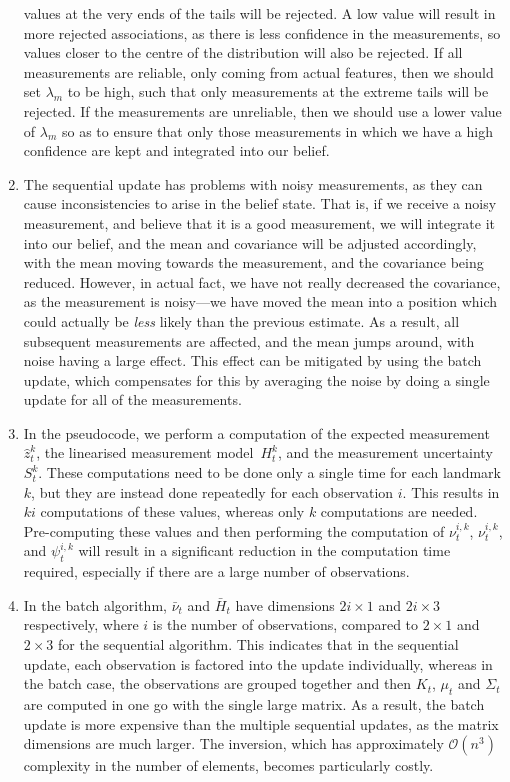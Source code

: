 \documentclass[a4paper,12pt]{article}
\begin{document}
\begin{enumerate}[resume]
  values at the very ends of the tails will be rejected. A low value will result
  in more rejected associations, as there is less confidence in the
  measurements, so values closer to the centre of the distribution will also be
  rejected. If all measurements are reliable, only coming from actual features,
  then we should set $\lambda_m$ to be high, such that only measurements at the
  extreme tails will be rejected. If the measurements are unreliable, then we
  should use a lower value of $\lambda_m$ so as to ensure that only those
  measurements in which we have a high confidence are kept and integrated into
  our belief.
\item The sequential update has problems with noisy measurements, as they can
  cause inconsistencies to arise in the belief state. That is, if we receive a
  noisy measurement, and believe that it is a good measurement, we will
  integrate it into our belief, and the mean and covariance will be adjusted
  accordingly, with the mean moving towards the measurement, and the covariance
  being reduced. However, in actual fact, we have not really decreased the
  covariance, as the measurement is noisy---we have moved the mean into a
  position which could actually be \emph{less} likely than the previous
  estimate. As a result, all subsequent measurements are affected, and the mean
  jumps around, with noise having a large effect. This effect can be mitigated
  by using the batch update, which compensates for this by averaging the noise
  by doing a single update for all of the measurements.
\item In the pseudocode, we perform a computation of the expected measurement
  $\hat{z}_t^k$, the linearised measurement model~$H_t^k$, and the measurement
  uncertainty~$S_t^k$. These computations need to be done only a single time for
  each landmark $k$, but they are instead done repeatedly for each observation
  $i$. This results in $ki$ computations of these values, whereas only $k$
  computations are needed. Pre-computing these values and then performing the
  computation of $\nu_t^{i,k}$, $\nu_t^{i,k}$, and $\psi_t^{i,k}$ will result in
  a significant reduction in the computation time required, especially if there
  are a large number of observations.
\item In the batch algorithm, $\bar{\nu}_t$ and $\bar{H}_t$ have dimensions
  $2i\times 1$ and $2i\times 3$ respectively, where $i$ is the number of
  observations, compared to $2\times 1$ and $2\times 3$ for the sequential
  algorithm. This indicates that in the sequential update, each observation is
  factored into the update individually, whereas in the batch case, the
  observations are grouped together and then $K_t$, $\mu_t$ and $\Sigma_t$ are
  computed in one go with the single large matrix. As a result, the batch update
  is more expensive than the multiple sequential updates, as the matrix
  dimensions are much larger. The inversion, which has approximately
  $\mathcal{O}(n^3)$ complexity in the number of elements, becomes particularly
  costly.
\end{enumerate}
\end{document}
